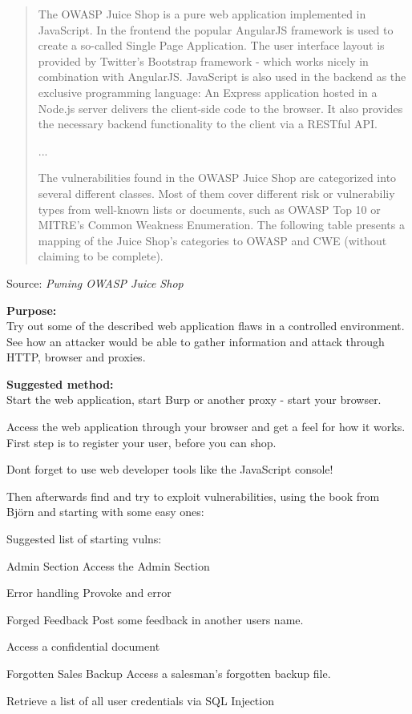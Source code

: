 \documentclass[a4paper,11pt,notitlepage]{report}
\begin{document}
\begin{quote}
The OWASP Juice Shop is a pure web application implemented in JavaScript. In the
frontend the popular AngularJS framework is used to create a so-called Single Page
Application. The user interface layout is provided by Twitter's Bootstrap framework - which
works nicely in combination with AngularJS.
JavaScript is also used in the backend as the exclusive programming language: An Express
application hosted in a Node.js server delivers the client-side code to the browser. It also
provides the necessary backend functionality to the client via a RESTful API.

...

The vulnerabilities found in the OWASP Juice Shop are categorized into several different
classes. Most of them cover different risk or vulnerabiliy types from well-known lists or
documents, such as OWASP Top 10 or MITRE's Common Weakness Enumeration. The
following table presents a mapping of the Juice Shop's categories to OWASP and CWE
(without claiming to be complete).
\end{quote}

Source: \emph{Pwning OWASP Juice Shop}


 {\bf Purpose:}\\
 Try out some of the described web application flaws in a controlled environment. See how an attacker would be able to gather information and attack through HTTP, browser and proxies.

 {\bf Suggested method:}\\
Start the web application, start Burp or another proxy - start your browser.

Access the web application through your browser and get a feel for how it works. First step is to register your user, before you can shop.

Dont forget to use web developer tools like the JavaScript console!

Then afterwards find and try to exploit vulnerabilities, using the book from Björn and starting with some easy ones:

Suggested list of starting vulns:
\begin{list2}
\item Admin Section Access the Admin Section
\item Error handling Provoke and error
\item Forged Feedback Post some feedback in another users name.
\item Access a confidential document
\item Forgotten Sales Backup Access a salesman's forgotten backup file.
\item Retrieve a list of all user credentials via SQL Injection
\end{list2}
\end{document}
